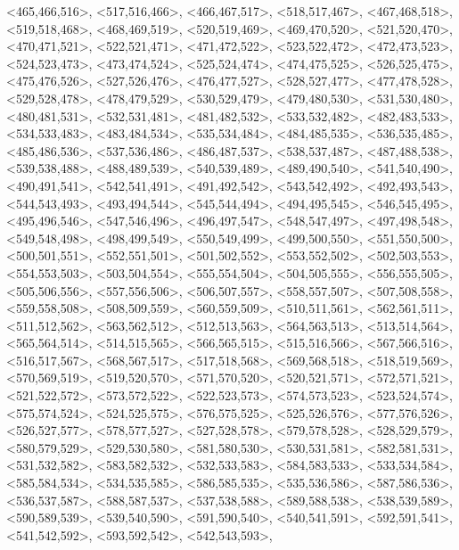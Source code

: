 \documentclass[a4paper,10pt]{article}
\begin{document}
\begin{eulernotebook}
\begin{euleroutput}
  <465,466,516>,
  <517,516,466>,
  <466,467,517>,
  <518,517,467>,
  <467,468,518>,
  <519,518,468>,
  <468,469,519>,
  <520,519,469>,
  <469,470,520>,
  <521,520,470>,
  <470,471,521>,
  <522,521,471>,
  <471,472,522>,
  <523,522,472>,
  <472,473,523>,
  <524,523,473>,
  <473,474,524>,
  <525,524,474>,
  <474,475,525>,
  <526,525,475>,
  <475,476,526>,
  <527,526,476>,
  <476,477,527>,
  <528,527,477>,
  <477,478,528>,
  <529,528,478>,
  <478,479,529>,
  <530,529,479>,
  <479,480,530>,
  <531,530,480>,
  <480,481,531>,
  <532,531,481>,
  <481,482,532>,
  <533,532,482>,
  <482,483,533>,
  <534,533,483>,
  <483,484,534>,
  <535,534,484>,
  <484,485,535>,
  <536,535,485>,
  <485,486,536>,
  <537,536,486>,
  <486,487,537>,
  <538,537,487>,
  <487,488,538>,
  <539,538,488>,
  <488,489,539>,
  <540,539,489>,
  <489,490,540>,
  <541,540,490>,
  <490,491,541>,
  <542,541,491>,
  <491,492,542>,
  <543,542,492>,
  <492,493,543>,
  <544,543,493>,
  <493,494,544>,
  <545,544,494>,
  <494,495,545>,
  <546,545,495>,
  <495,496,546>,
  <547,546,496>,
  <496,497,547>,
  <548,547,497>,
  <497,498,548>,
  <549,548,498>,
  <498,499,549>,
  <550,549,499>,
  <499,500,550>,
  <551,550,500>,
  <500,501,551>,
  <552,551,501>,
  <501,502,552>,
  <553,552,502>,
  <502,503,553>,
  <554,553,503>,
  <503,504,554>,
  <555,554,504>,
  <504,505,555>,
  <556,555,505>,
  <505,506,556>,
  <557,556,506>,
  <506,507,557>,
  <558,557,507>,
  <507,508,558>,
  <559,558,508>,
  <508,509,559>,
  <560,559,509>,
  <510,511,561>,
  <562,561,511>,
  <511,512,562>,
  <563,562,512>,
  <512,513,563>,
  <564,563,513>,
  <513,514,564>,
  <565,564,514>,
  <514,515,565>,
  <566,565,515>,
  <515,516,566>,
  <567,566,516>,
  <516,517,567>,
  <568,567,517>,
  <517,518,568>,
  <569,568,518>,
  <518,519,569>,
  <570,569,519>,
  <519,520,570>,
  <571,570,520>,
  <520,521,571>,
  <572,571,521>,
  <521,522,572>,
  <573,572,522>,
  <522,523,573>,
  <574,573,523>,
  <523,524,574>,
  <575,574,524>,
  <524,525,575>,
  <576,575,525>,
  <525,526,576>,
  <577,576,526>,
  <526,527,577>,
  <578,577,527>,
  <527,528,578>,
  <579,578,528>,
  <528,529,579>,
  <580,579,529>,
  <529,530,580>,
  <581,580,530>,
  <530,531,581>,
  <582,581,531>,
  <531,532,582>,
  <583,582,532>,
  <532,533,583>,
  <584,583,533>,
  <533,534,584>,
  <585,584,534>,
  <534,535,585>,
  <586,585,535>,
  <535,536,586>,
  <587,586,536>,
  <536,537,587>,
  <588,587,537>,
  <537,538,588>,
  <589,588,538>,
  <538,539,589>,
  <590,589,539>,
  <539,540,590>,
  <591,590,540>,
  <540,541,591>,
  <592,591,541>,
  <541,542,592>,
  <593,592,542>,
  <542,543,593>,

\end{euleroutput}
\end{eulernotebook}
\end{document}
